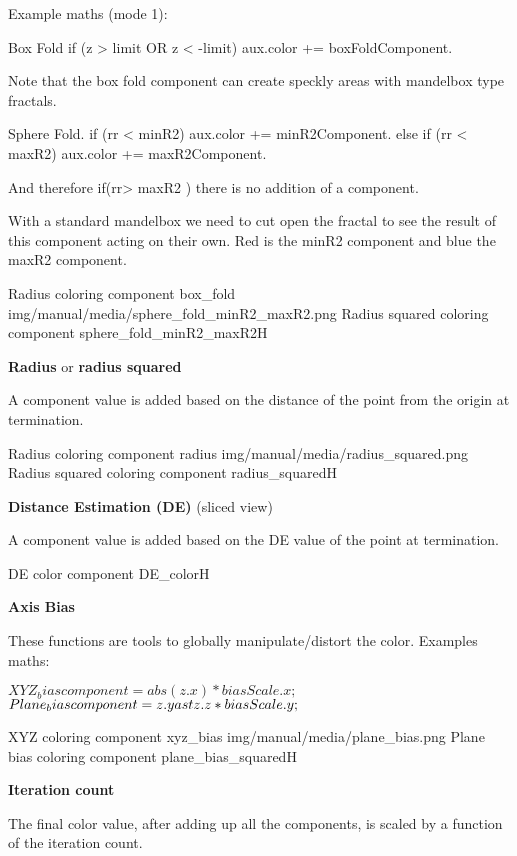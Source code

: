 Example  maths (mode 1):

Box Fold
if  (z  >  limit  OR  z  <   -limit)   aux.color +=  boxFoldComponent.

Note that the box fold component can create  speckly areas with mandelbox type fractals.

Sphere Fold. 
if (rr < minR2)    aux.color +=  minR2Component.
else if (rr < maxR2)    aux.color +=  maxR2Component.

And therefore  if(rr> maxR2 ) there is no addition of a component.

With a standard mandelbox we need to cut open the fractal to see the result of this component acting on their own. Red is the minR2 component and blue the maxR2 component.

{Radius coloring component}
{box_fold}
{img/manual/media/sphere_fold_minR2_maxR2.png}
{Radius squared coloring component}
{sphere_fold_minR2_maxR2}{H}

\textbf{Radius} or \textbf{radius squared} 

A  component value is added based on the distance of the point from the origin at termination.

{Radius coloring component}
{radius}
{img/manual/media/radius_squared.png}
{Radius squared coloring component}
{radius_squared}{H}

\textbf{Distance Estimation (DE)}  (sliced view)

A  component value is added based on the DE value of the point at termination.

{DE color component}
{DE_color}{H}

\textbf{Axis Bias}

These functions are tools to globally manipulate/distort the color. 
Examples maths:

$XYZ_bias                component = abs(z.x) \ast biasScale.x;$
$Plane_bias              component = z.y \\ast z.z \ast biasScale.y;$

{XYZ coloring component}
{xyz_bias}
{img/manual/media/plane_bias.png}
{Plane bias coloring component}
{plane_bias_squared}{H}

\textbf{Iteration count}

The final color value, after adding up all the components, is  scaled by a function of the iteration count.

